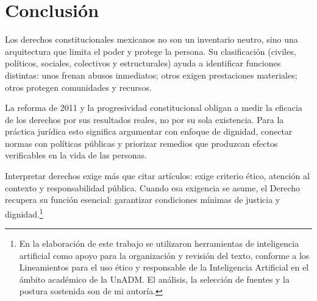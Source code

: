\documentclass[
	spanish,
	letterpaper, oneside
]{article}
\begin{document}
\section{Conclusión}

Los derechos constitucionales mexicanos no son un inventario neutro, sino una arquitectura que limita el poder y protege la persona. Su clasificación (civiles, políticos, sociales, colectivos y estructurales) ayuda a identificar funciones distintas: unos frenan abusos inmediatos; otros exigen prestaciones materiales; otros protegen comunidades y recursos.

La reforma de 2011 y la progresividad constitucional obligan a medir la eficacia de los derechos por sus resultados reales, no por su sola existencia. Para la práctica jurídica esto significa argumentar con enfoque de dignidad, conectar normas con políticas públicas y priorizar remedios que produzcan efectos verificables en la vida de las personas.

Interpretar derechos exige más que citar artículos: exige criterio ético, atención al contexto y responsabilidad pública. Cuando esa exigencia se asume, el Derecho recupera su función esencial: garantizar condiciones mínimas de justicia y dignidad.\footnote{En la elaboración de este trabajo se utilizaron herramientas de inteligencia artificial como apoyo para la organización y revisión del texto, conforme a los Lineamientos para el uso ético y responsable de la Inteligencia Artificial en el ámbito académico de la UnADM. El análisis, la selección de fuentes y la postura sostenida son de mi autoría.}



\end{document}
